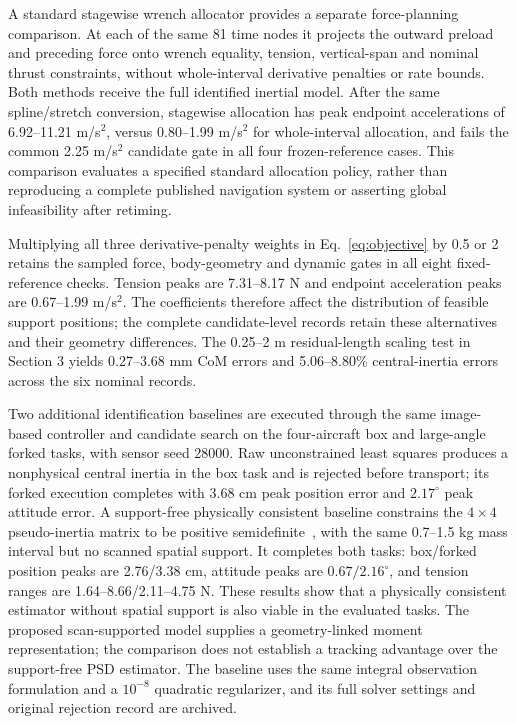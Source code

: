 A standard stagewise wrench allocator provides a separate force-planning comparison. At each of the same 81 time nodes it projects the outward preload and preceding force onto wrench equality, tension, vertical-span and nominal thrust constraints, without whole-interval derivative penalties or rate bounds. Both methods receive the full identified inertial model. After the same spline/stretch conversion, stagewise allocation has peak endpoint accelerations of 6.92--11.21 m/s$^2$, versus 0.80--1.99 m/s$^2$ for whole-interval allocation, and fails the common 2.25 m/s$^2$ candidate gate in all four frozen-reference cases. This comparison evaluates a specified standard allocation policy, rather than reproducing a complete published navigation system or asserting global infeasibility after retiming.

Multiplying all three derivative-penalty weights in Eq.~\eqref{eq:objective} by 0.5 or 2 retains the sampled force, body-geometry and dynamic gates in all eight fixed-reference checks. Tension peaks are 7.31--8.17 N and endpoint acceleration peaks are 0.67--1.99 m/s$^2$. The coefficients therefore affect the distribution of feasible support positions; the complete candidate-level records retain these alternatives and their geometry differences. The 0.25--2 m residual-length scaling test in Section 3 yields 0.27--3.68 mm CoM errors and 5.06--8.80\% central-inertia errors across the six nominal records.

Two additional identification baselines are executed through the same image-based controller and candidate search on the four-aircraft box and large-angle forked tasks, with sensor seed 28000. Raw unconstrained least squares produces a nonphysical central inertia in the box task and is rejected before transport; its forked execution completes with 3.68 cm peak position error and $2.17^\circ$ peak attitude error. A support-free physically consistent baseline constrains the $4\times4$ pseudo-inertia matrix to be positive semidefinite~\cite{wensing2018}, with the same 0.7--1.5 kg mass interval but no scanned spatial support. It completes both tasks: box/forked position peaks are 2.76/3.38 cm, attitude peaks are $0.67/2.16^\circ$, and tension ranges are 1.64--8.66/2.11--4.75 N. These results show that a physically consistent estimator without spatial support is also viable in the evaluated tasks. The proposed scan-supported model supplies a geometry-linked moment representation; the comparison does not establish a tracking advantage over the support-free PSD estimator. The baseline uses the same integral observation formulation and a $10^{-8}$ quadratic regularizer, and its full solver settings and original rejection record are archived.

